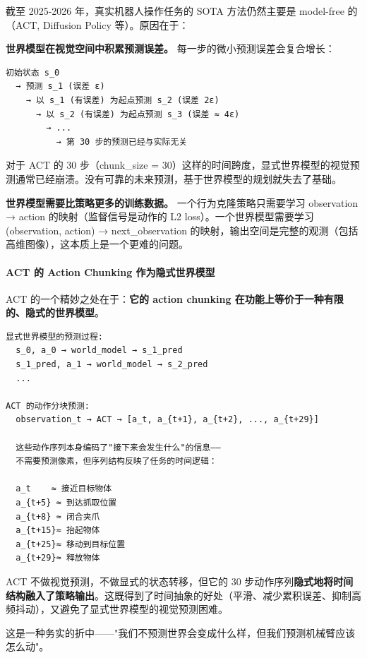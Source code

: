 \documentclass[UTF8,a4paper,11pt]{ctexart}
\begin{document}
{截至 2025-2026 年，真实机器人操作任务的 SOTA 方法仍然主要是 model-free 的（ACT, Diffusion Policy 等）。原因在于：

\textbf{世界模型在视觉空间中积累预测误差。} 每一步的微小预测误差会复合增长：

\begin{lstlisting}[language=text]
初始状态 s_0
  → 预测 s_1 (误差 ε)
    → 以 s_1 (有误差) 为起点预测 s_2 (误差 2ε)
      → 以 s_2 (有误差) 为起点预测 s_3 (误差 ≈ 4ε)
        → ...
          → 第 30 步的预测已经与实际无关
\end{lstlisting}

对于 ACT 的 30 步（chunk_size = 30）这样的时间跨度，显式世界模型的视觉预测通常已经崩溃。没有可靠的未来预测，基于世界模型的规划就失去了基础。

\textbf{世界模型需要比策略更多的训练数据。} 一个行为克隆策略只需要学习 observation → action 的映射（监督信号是动作的 L2 loss）。一个世界模型需要学习 (observation, action) → next_observation 的映射，输出空间是完整的观测（包括高维图像），这本质上是一个更难的问题。

\paragraph{ACT 的 Action Chunking 作为隐式世界模型}


ACT 的一个精妙之处在于：\textbf{它的 action chunking 在功能上等价于一种有限的、隐式的世界模型}。

\begin{lstlisting}[language=text]
显式世界模型的预测过程:
  s_0, a_0 → world_model → s_1_pred
  s_1_pred, a_1 → world_model → s_2_pred
  ...

ACT 的动作分块预测:
  observation_t → ACT → [a_t, a_{t+1}, a_{t+2}, ..., a_{t+29}]
  
  这些动作序列本身编码了"接下来会发生什么"的信息——
  不需要预测像素，但序列结构反映了任务的时间逻辑：
  
  a_t    ≈ 接近目标物体
  a_{t+5} ≈ 到达抓取位置  
  a_{t+8} ≈ 闭合夹爪
  a_{t+15}≈ 抬起物体
  a_{t+25}≈ 移动到目标位置
  a_{t+29}≈ 释放物体
\end{lstlisting}

ACT 不做视觉预测，不做显式的状态转移，但它的 30 步动作序列\textbf{隐式地将时间结构融入了策略输出}。这既得到了时间抽象的好处（平滑、减少累积误差、抑制高频抖动），又避免了显式世界模型的视觉预测困难。

这是一种务实的折中——"我们不预测世界会变成什么样，但我们预测机械臂应该怎么动"。

}
\end{document}
